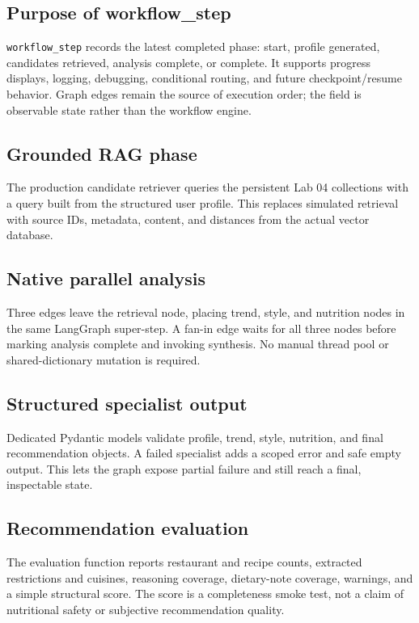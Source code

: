 \documentclass[11pt]{article}
\begin{document}
\subsection{Purpose of workflow\_step}

\texttt{workflow\_step} records the latest completed phase: start, profile
generated, candidates retrieved, analysis complete, or complete. It supports
progress displays, logging, debugging, conditional routing, and future
checkpoint/resume behavior. Graph edges remain the source of execution order;
the field is observable state rather than the workflow engine.

\subsection{Grounded RAG phase}

The production candidate retriever queries the persistent Lab 04 collections
with a query built from the structured user profile. This replaces simulated
retrieval with source IDs, metadata, content, and distances from the actual
vector database.

\subsection{Native parallel analysis}

Three edges leave the retrieval node, placing trend, style, and nutrition nodes
in the same LangGraph super-step. A fan-in edge waits for all three nodes before
marking analysis complete and invoking synthesis. No manual thread pool or
shared-dictionary mutation is required.

\subsection{Structured specialist output}

Dedicated Pydantic models validate profile, trend, style, nutrition, and final
recommendation objects. A failed specialist adds a scoped error and safe empty
output. This lets the graph expose partial failure and still reach a final,
inspectable state.

\subsection{Recommendation evaluation}

The evaluation function reports restaurant and recipe counts, extracted
restrictions and cuisines, reasoning coverage, dietary-note coverage, warnings,
and a simple structural score. The score is a completeness smoke test, not a
claim of nutritional safety or subjective recommendation quality.
\end{document}
